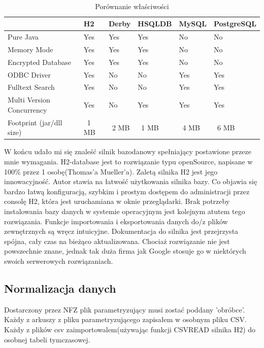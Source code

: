 \begin{table}[h]
 \caption{Porównanie właściwości}
 \tiny\tt
 \centering
 \vspace{0in}
 \begin{tabular}{|l|l|l|l|l|l|}
 \hline
  & \textbf{H2} & \textbf{Derby} & \textbf{HSQLDB} & \textbf{MySQL} & \textbf{PostgreSQL} \\
 \hline
 Pure Java & Yes & Yes & Yes & No & No \\
 \hline
 Memory Mode & Yes & Yes & Yes & No & No \\
 \hline
 Encrypted Database & Yes & Yes & Yes & No & No \\
 \hline
 ODBC Driver & Yes & No & No & Yes & Yes \\
 \hline
 Fulltext Search & Yes & No & No & Yes & Yes \\
 \hline
 Multi Version Concurrency & Yes & No & Yes & Yes & Yes \\
 \hline
 Footprint (jar/dll size) & ~1 MB & ~2 MB & ~1 MB & ~4 MB & ~6 MB \\
 \hline
 \end{tabular}
\end{table}

W końcu udało mi się znaleść silnik bazodanowy spełniający postawione przeze mnie wymagania. H2-database jest to rozwiązanie typu openSource, napisane w 100\% przez 1 osobę(Thomas'a Mueller'a). Zaletą silnika H2 jest jego innowacyjność. Autor stawia na łatwość użytkowania silnika bazy. Co objawia się bardzo łatwą konfiguracją, szybkim i prostym dostępem do administracji przez consolę H2, która jest uruchamiana w oknie przeglądarki. Brak potrzeby instalowania bazy danych w systemie operacyjnym jest kolejnym atutem tego rozwiązania. Funkcje importowania i eksportowania danych do/z plików zewnętrznych są wręcz intuicyjne. Dokumentacja do silnika jest przejrzysta spójna, cały czas na bieżąco aktualizowana. Chociaż rozwiązanie nie jest powszechnie znane, jednak tak duża firma jak Google stosuje go w niektórych swoich serwerowych rozwiązaniach.

\subsection{Normalizacja danych}
\label{sec:normalizacjaDanych}

Dostarczony przez NFZ plik parametryzujący musi zostać poddany 'obróbce'. Każdy z arkuszy z pliku parametryzującego zapisałem w osobnym pliku CSV. Każdy z plików csv zaimportowalem(używając funkcji CSVREAD silnika H2) do osobnej tabeli tymczasowej.

